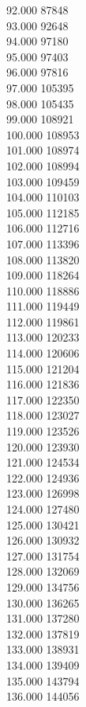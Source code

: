 { 92.000	87848 \\
 93.000	92648 \\
 94.000	97180 \\
 95.000	97403 \\
 96.000	97816 \\
 97.000	105395 \\
 98.000	105435 \\
 99.000	108921 \\
 100.000	108953 \\
 101.000	108974 \\
 102.000	108994 \\
 103.000	109459 \\
 104.000	110103 \\
 105.000	112185 \\
 106.000	112716 \\
 107.000	113396 \\
 108.000	113820 \\
 109.000	118264 \\
 110.000	118886 \\
 111.000	119449 \\
 112.000	119861 \\
 113.000	120233 \\
 114.000	120606 \\
 115.000	121204 \\
 116.000	121836 \\
 117.000	122350 \\
 118.000	123027 \\
 119.000	123526 \\
 120.000	123930 \\
 121.000	124534 \\
 122.000	124936 \\
 123.000	126998 \\
 124.000	127480 \\
 125.000	130421 \\
 126.000	130932 \\
 127.000	131754 \\
 128.000	132069 \\
 129.000	134756 \\
 130.000	136265 \\
 131.000	137280 \\
 132.000	137819 \\
 133.000	138931 \\
 134.000	139409 \\
 135.000	143794 \\
 136.000	144056 \\
}
